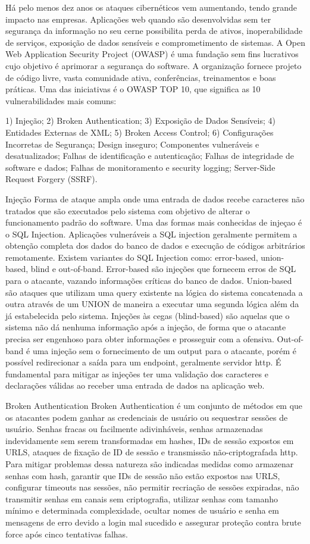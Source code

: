 Há pelo menos dez anos os ataques cibernéticos vem aumentando, tendo grande impacto nas empresas.
Aplicações web quando são desenvolvidas sem ter segurança da informação no seu cerne possibilita perda de ativos, inoperabilidade de serviços, exposição de dados sensíveis e comprometimento de sistemas. 
A Open Web Application Security Project (OWASP) é uma fundação sem fins lucrativos cujo objetivo é aprimorar a segurança do software. A organização fornece projeto de código livre, vasta comunidade ativa, conferências, treinamentos e boas práticas. Uma das iniciativas é o OWASP TOP 10, que significa as 10 vulnerabilidades mais comuns:

1) Injeção;
2) Broken Authentication;
3) Exposição de Dados Sensíveis;
4) Entidades Externas de XML;
5) Broken Access Control;
6) Configurações Incorretas de Segurança;
Design inseguro;
Componentes vulneráveis e desatualizados;
Falhas de identificação e autenticação;
Falhas de integridade de software e dados;
Falhas de monitoramento e security logging;
Server-Side Request Forgery (SSRF).

Injeção
Forma de ataque ampla onde uma entrada de dados recebe caracteres não tratados que são executados pelo sistema com objetivo de alterar o funcionamento padrão do software.
Uma das formas mais conhecidas de injeçao é o SQL Injection. Aplicações vulneráveis a SQL injection geralmente permitem a obtenção completa dos dados do banco de dados e execução de códigos arbitrários remotamente. Existem variantes do SQL Injection como: error-based, union-based, blind e out-of-band. Error-based são injeções que fornecem erros de SQL para o atacante, vazando informações críticas do banco de dados. Union-based são ataques que utilizam uma query existente na lógica do sistema concatenada a outra através de um UNION de maneira a executar uma segunda lógica além da já estabelecida pelo sistema. Injeções às cegas (blind-based) são aquelas que o sistema não dá nenhuma informação após a injeção, de forma que o atacante precisa ser engenhoso para obter informações e prosseguir com a ofensiva. Out-of-band é uma injeção sem o fornecimento de um output para o atacante, porém é possível redirecionar a saída para um endpoint, geralmente servidor http.
É fundamental para mitigar as injeções ter uma validação dos caracteres e declarações válidas ao receber uma entrada de dados na aplicação web.

Broken Authentication
Broken Authentication é um conjunto de métodos em que os atacantes podem ganhar as credenciais de usuário ou sequestrar sessões de usuário. Senhas fracas ou facilmente adivinháveis, senhas armazenadas indevidamente sem serem transformadas em hashes, IDs de sessão expostos em URLS, ataques de fixação de ID de sessão e transmissão não-criptografada http.
Para mitigar problemas dessa natureza são indicadas medidas como armazenar senhas com hash, garantir que IDs de sessão não estão expostos nas URLS, configurar timeouts nas sessões, não permitir recriação de sessões expiradas, não transmitir senhas em canais sem criptografia, utilizar senhas com tamanho mínimo e determinada complexidade, ocultar nomes de usuário e senha em mensagens de erro devido a login mal sucedido e assegurar proteção contra brute force após cinco tentativas falhas.

